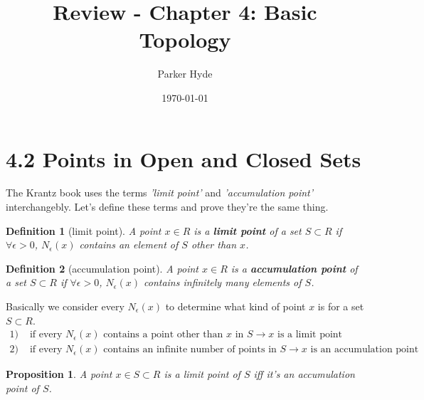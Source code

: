 \documentclass{article}
\begin{document}
\title{Review - Chapter 4: Basic Topology}
\author{Parker Hyde}
\date{\today}
\maketitle

\newtheorem{theorem}{Theorem}
\newtheorem{definition}{Definition}
\newtheorem{exmp}{Example}
\newtheorem{proposition}{Proposition}

\section*{4.2 Points in Open and Closed Sets}

The Krantz book uses the terms \textit{'limit point'} and \textit{'accumulation point'}
interchangebly. Let's define these terms and prove they're the same thing.


\begin{definition}[limit point]
    A point \( x \in R \) is a \textbf{limit point} of a set \( S \subset R \) 
    if \( \forall \epsilon > 0\),  \( N_\epsilon(x) \) contains an element of 
     \( S \) other than \( x \).
\end{definition}
\begin{definition}[accumulation point]
    A point \( x \in R \) is a \textbf{accumulation point} of a set \( S \subset R \) 
    if \( \forall \epsilon > 0\),  \( N_\epsilon(x) \) contains infinitely many elements 
    of \( S \).
\end{definition}

Basically we consider every \( N_\epsilon(x) \) to determine what kind of point
\( x \) is for a set \( S \subset R \).
\begin{align*}
    1) & \text{ if every } N_\epsilon(x) \text{ contains a point other than } x \text{ in } S \rightarrow x \text{ is a limit point}\\
    2) & \text{ if every } N_\epsilon(x) \text{ contains an infinite number of points} \text{ in } S \rightarrow x \text{ is an accumulation point}
\end{align*}

\begin{proposition}
   A point \( x \in S \subset R \) is a limit point of \( S \) iff it's an
   accumulation point of \( S \).
\end{proposition}
\end{document}

